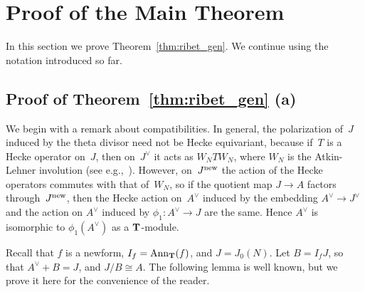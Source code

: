\documentclass[10pt,twoside]{article}
\newcommand{\T}{{\bf{T}}}
\newcommand{\ra}{\rightarrow}
\newcommand{\po}{\phi_1}
\newcommand{\Adual}{A^{\vee}}
\newcommand{\Jdual}{J^{\vee}}
\newcommand{\isom}{\cong}
\theoremstyle{definition}
\begin{document}
\section{Proof of the Main Theorem}\label{sec:main}
In this section we prove Theorem~\ref{thm:ribet_gen}.
We continue using the notation introduced so far.

\subsection{Proof of Theorem~\ref{thm:ribet_gen} (a)}
\label{sec:firstpart}

We begin with a remark about compatibilities.  In general, the
polarization of~$J$ induced by the theta divisor need not be Hecke
equivariant, because if~$T$ is a Hecke operator on~$J$, then
on~$\Jdual$ it acts as $W_N T W_N$, where $W_N$ is the Atkin-Lehner
involution (see e.g.,~\cite[Rem.~10.2.2]{diamond-im}).  However,
on~$J^{\rm new}$ the action of the Hecke operators commutes with that
of~$W_N$, so if the quotient map $J \ra A$ factors through~$J^{\rm new}$,
then the Hecke action on~$\Adual$ induced by the embedding $\Adual \to
J^{\vee}$ and the action on $\Adual$ induced by $\phi_1:\Adual\to{}J$
are the same.  Hence $\Adual$ is isomorphic to $\po(\Adual)$ 
as a $\T$-module.

Recall that $f$ is a newform, $I_f = {\rm Ann}_\T (f)$, and
$J=J_0(N)$.  Let $B = I_fJ$, so that $\Adual+B=J$, and $J/B\isom A$.
The following lemma is well known, but we prove it here for the
convenience of the reader.
\end{document}
